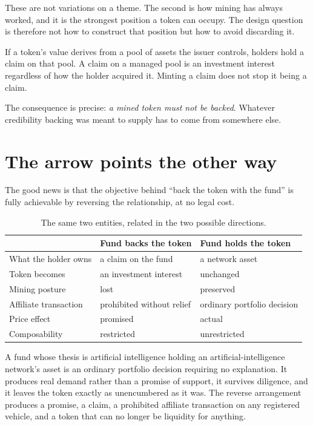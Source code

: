 \documentclass[11pt,a4paper]{article}
\begin{document}
These are not variations on a theme. The second is how mining has always worked,
and it is the strongest position a token can occupy. The design question is
therefore not how to construct that position but how to avoid discarding it.

\begin{proposition}
If a token's value derives from a pool of assets the issuer controls, holders
hold a claim on that pool. A claim on a managed pool is an investment interest
regardless of how the holder acquired it. Minting a claim does not stop it being
a claim.
\end{proposition}

The consequence is precise: \emph{a mined token must not be backed}. Whatever
credibility backing was meant to supply has to come from somewhere else.

\section{The arrow points the other way}

The good news is that the objective behind ``back the token with the fund'' is
fully achievable by reversing the relationship, at no legal cost.

\begin{table}[h]
\centering
\begin{tabularx}{\textwidth}{lXX}
\toprule
 & Fund backs the token & Fund holds the token \\
\midrule
What the holder owns & a claim on the fund & a network asset \\
Token becomes & an investment interest & unchanged \\
Mining posture & lost & preserved \\
Affiliate transaction & prohibited without relief & ordinary portfolio decision \\
Price effect & promised & actual \\
Composability & restricted & unrestricted \\
\bottomrule
\end{tabularx}
\caption{The same two entities, related in the two possible directions.}
\end{table}

A fund whose thesis is artificial intelligence holding an artificial-intelligence
network's asset is an ordinary portfolio decision requiring no explanation. It
produces real demand rather than a promise of support, it survives diligence, and
it leaves the token exactly as unencumbered as it was. The reverse arrangement
produces a promise, a claim, a prohibited affiliate transaction on any registered
vehicle, and a token that can no longer be liquidity for anything.
\end{document}
